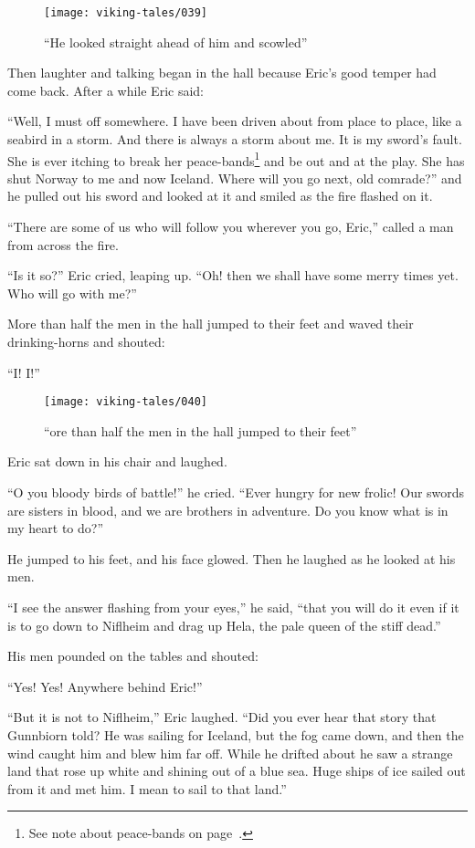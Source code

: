 \begin{figure}[ht]
    \centering
    \texttt{[image: viking-tales/039]}
    \caption{``He looked straight ahead of him and scowled''}
\end{figure}

Then laughter and talking began in the hall because Eric's good temper
had come back. After a while Eric said:

``Well, I must off somewhere. I have been driven about from place to
place, like a seabird in a storm. And there is always a storm about me.
It is my sword's fault. She is ever itching to break her
peace-bands\footnote{See note about peace-bands on
page~\pageref{peace-bands}.} and be out and at the play. She has shut
Norway to me and now Iceland. Where will you go next, old comrade?'' and
he pulled out his sword and looked at it and smiled as the fire flashed
on it.

``There are some of us who will follow you wherever you go, Eric,''
called a man from across the fire.

``Is it so?'' Eric cried, leaping up. ``Oh! then we shall have some
merry times yet. Who will go with me?''

More than half the men in the hall jumped to their feet and waved their
drinking-horns and shouted:

``I! I!''

\begin{figure}[ht]
    \centering
    \texttt{[image: viking-tales/040]}
    \caption{``ore than half the men in the hall jumped to their feet''}
\end{figure}

Eric sat down in his chair and laughed.

``O you bloody birds of battle!'' he cried. ``Ever hungry for new
frolic! Our swords are sisters in blood, and we are brothers in
adventure. Do you know what is in my heart to do?''

He jumped to his feet, and his face glowed. Then he laughed as he looked
at his men.

``I see the answer flashing from your eyes,'' he said, ``that you will
do it even if it is to go down to Niflheim and drag up Hela, the pale
queen of the stiff dead.''

His men pounded on the tables and shouted:

``Yes! Yes! Anywhere behind Eric!''

``But it is not to Niflheim,'' Eric laughed. ``Did you ever hear that
story that Gunnbiorn told? He was sailing for Iceland, but the fog came
down, and then the wind caught him and blew him far off. While he
drifted about he saw a strange land that rose up white and shining out
of a blue sea. Huge ships of ice sailed out from it and met him. I mean
to sail to that land.''

